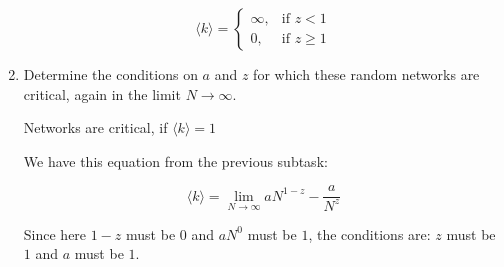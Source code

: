 \begin{enumerate}
  \[
   \langle k \rangle = 
\begin{cases}
    \infty, & \text{if } z < 1\\
    0, & \text{if }z \geq 1
\end{cases}
\]

	\item Determine the conditions on $a$ and $z$ for which these random networks are critical,  again in the limit $N \rightarrow \infty$.
	
	Networks are critical, if $\langle k \rangle = 1$
	
	We have this equation from the previous subtask: 
	
	\begin{equation}
		\langle k \rangle = \lim\limits_{N \rightarrow \infty} aN^{1-z} - \frac{a}{N^z}
	\end{equation}
	
	Since here $1-z$ must be $0$ and $aN^0$ must be $1$, the conditions are:  $z$ must be $1$ and $a$ must be $1$.
	
	
\end{enumerate}
